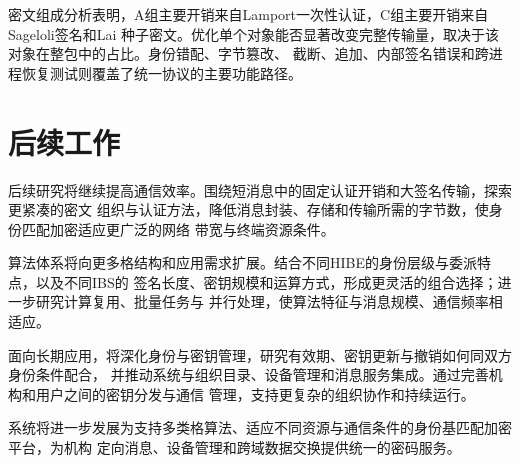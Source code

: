密文组成分析表明，A组主要开销来自Lamport一次性认证，C组主要开销来自Sageloli签名和Lai
种子密文。优化单个对象能否显著改变完整传输量，取决于该对象在整包中的占比。身份错配、字节篡改、
截断、追加、内部签名错误和跨进程恢复测试则覆盖了统一协议的主要功能路径。

\section{后续工作}

后续研究将继续提高通信效率。围绕短消息中的固定认证开销和大签名传输，探索更紧凑的密文
组织与认证方法，降低消息封装、存储和传输所需的字节数，使身份匹配加密适应更广泛的网络
带宽与终端资源条件。

算法体系将向更多格结构和应用需求扩展。结合不同HIBE的身份层级与委派特点，以及不同IBS的
签名长度、密钥规模和运算方式，形成更灵活的组合选择；进一步研究计算复用、批量任务与
并行处理，使算法特征与消息规模、通信频率相适应。

面向长期应用，将深化身份与密钥管理，研究有效期、密钥更新与撤销如何同双方身份条件配合，
并推动系统与组织目录、设备管理和消息服务集成。通过完善机构和用户之间的密钥分发与通信
管理，支持更复杂的组织协作和持续运行。

系统将进一步发展为支持多类格算法、适应不同资源与通信条件的身份基匹配加密平台，为机构
定向消息、设备管理和跨域数据交换提供统一的密码服务。
